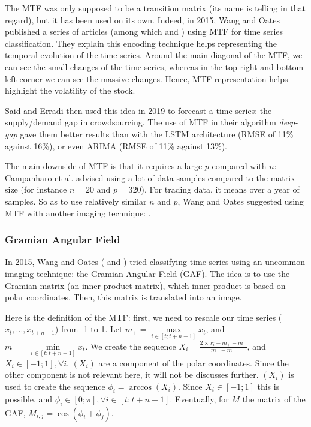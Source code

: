 \documentclass[11pt]{article}
\begin{document}
\begin{onehalfspace}
The MTF was only supposed to be a transition matrix (its name is telling in that regard), but it has been used on its own. Indeed, in 2015, Wang and Oates published a series of articles (among which \cite{wang} and \cite{wang_encod}) using MTF for time series classification. They explain this encoding technique helps representing the temporal evolution of the time series. Around the main diagonal of the MTF, we can see the small changes of the time series, whereas in the top-right and bottom-left corner we can see the massive changes. Hence, MTF representation helps highlight the volatility of the stock. 

Said and Erradi \cite{said} then used this idea in 2019 to forecast a time series: the supply/demand gap in crowdsourcing. The use of MTF in their algorithm \emph{deep-gap} gave them better results than with the LSTM architecture (RMSE of 11\% against 16\%), or even ARIMA (RMSE of 11\% against 13\%).

The main downside of MTF is that it requires a large $p$ compared with $n$: Campanharo et al. \cite{campanharo} advised using a lot of data samples compared to the matrix size (for instance $n = 20$ and $p = 320$). For trading data, it means over a year of samples. So as to use relatively similar $n$ and $p$, Wang and Oates \cite{wang_encod} suggested using MTF with another imaging technique: .

\subsubsection{Gramian Angular Field}
\label{gaf}

In 2015, Wang and Oates (\cite{wang_encod} and \cite{wang}) tried classifying time series using an uncommon imaging technique: the Gramian Angular Field (GAF). The idea is to use the Gramian matrix (an inner product matrix), which inner product is based on polar coordinates. Then, this matrix is translated into an image. 

Here is the definition of the MTF: first, we need to rescale our time series ($x_t, ..., x_{t+n-1}$) from -1 to 1. Let $m_+ = \max\limits_{i \in [t; t+n-1]} x_t$, and $m_- = \min\limits_{i \in [t; t+n-1]} x_t$. We create the sequence $X_i = \frac{2 \times x_i - m_+ - m_-}{m_+ - m_-}$, and $X_i \in [-1;1], \forall i$. $(X_i)$ are a component of the polar coordinates. Since the other component is not relevant here, it will not be discusses further. $(X_i)$ is used to create the sequence $\phi_i = \arccos(X_i)$. Since $X_i \in [-1;1]$ this is possible, and $\phi_i \in [0;\pi], \forall i \in [t;t+n-1]$. Eventually, for $M$ the matrix of the GAF, $M_{i,j} = \cos(\phi_i + \phi_j)$.


\end{onehalfspace}
\end{document}

